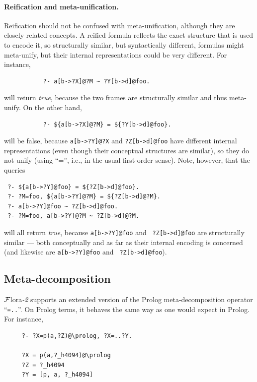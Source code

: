 \documentclass[11pt]{article}
\newcommand{\FLSYSTEM}{{\mbox{\sc ${\cal F}${lora}\rm\emph{-2}}}\xspace}
\begin{document}
\paragraph{Reification and meta-unification.}
Reification should not be confused with meta-unification, although they are
closely related concepts. A reified formula reflects the exact structure that is used
to encode it, so structurally similar, but syntactically different, formulas
might meta-unify, but their internal representations could be very different.
For instance, 
\begin{verbatim}
           ?- a[b->?X]@?M ~ ?Y[b->d]@foo.
\end{verbatim}
will return \emph{true}, because the two frames are structurally similar
and thus meta-unify. On the other hand,
\begin{verbatim}
           ?- ${a[b->?X]@?M} = ${?Y[b->d]@foo}.
\end{verbatim}
will be false, because {\tt a[b->?Y]@?X} and {\tt ?Z[b->d]@foo} have different
internal representations (even though their conceptual structures are
similar), so they do not unify (using ``='', i.e., in the usual
first-order sense). Note, however, that the queries
\begin{verbatim}
 ?- ${a[b->?Y]@foo} = ${?Z[b->d]@foo}.
 ?- ?M=foo, ${a[b->?Y]@?M} = ${?Z[b->d]@?M}.
 ?- a[b->?Y]@foo ~ ?Z[b->d]@foo.
 ?- ?M=foo, a[b->?Y]@?M ~ ?Z[b->d]@?M.
\end{verbatim}
will all return \emph{true}, because {\tt a[b->?Y]@foo} and {\tt
  ?Z[b->d]@foo} are structurally similar --- both conceptually and as far as
  their
internal encoding is concerned (and likewise are {\tt a[b->?Y]@foo} and {\tt
  ?Z[b->d]@foo}).

\subsection{Meta-decomposition}\label{sec-meta-decomp}

\FLSYSTEM supports an extended version of the Prolog meta-decomposition
operator ``{\tt =..}''. On Prolog terms, it behaves the same way as one
would expect in Prolog. For instance, 
\begin{verbatim}
     ?- ?X=p(a,?Z)@\prolog, ?X=..?Y.
 
     ?X = p(a,?_h4094)@\prolog
     ?Z = ?_h4094
     ?Y = [p, a, ?_h4094]
\end{verbatim}
\end{document}
